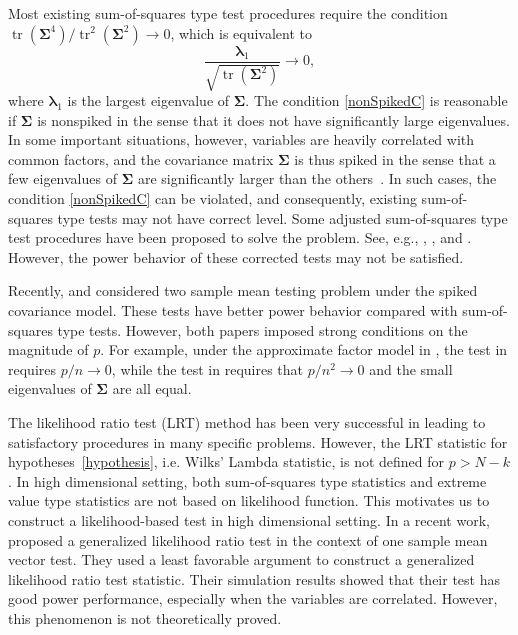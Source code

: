 \documentclass[12pt]{article} %
\DeclareMathOperator{\mytr}{tr}
\newcommand{\bfsym}[1]{\ensuremath{\boldsymbol{#1}}}
\def\blambda {\bfsym {\lambda}}
\def\bSigma {\bfsym {\Sigma}}
\theoremstyle{definition}
\begin{document}
Most existing sum-of-squares type test procedures require the condition 
$\mytr(\bSigma^4)/\mytr^2(\bSigma^2)\to 0$, which is equivalent to
\begin{equation}\label{nonSpikedC}
    \frac{\blambda_1}{\sqrt{\mytr(\bSigma^2)}}\to 0,
\end{equation}
where $\blambda_1$ is the largest eigenvalue of $\bSigma$.
The condition \eqref{nonSpikedC} is reasonable if $\bSigma$ is nonspiked in the sense that it does not have significantly large eigenvalues.
In some important situations, however, variables are heavily correlated with common factors, and the covariance matrix $\bSigma$ is thus spiked in the sense that a few eigenvalues of $\bSigma$ are significantly larger than the others~\citep{Fan2013Large,Cai2015Optimal,wang2017As}.
In such cases, the condition \eqref{nonSpikedC} can be violated, and consequently, existing sum-of-squares type tests may not have correct level.
Some adjusted sum-of-squares type test procedures have been proposed to solve the problem.
See, e.g.,
\cite{Katayama2013Asymptotic}, \cite{Ma2015A}, \cite{ZHANG2017200} and \cite{WANG2018}.
However, the power behavior of these corrected tests may not be satisfied.


Recently, \cite{Aoshima2018} and \cite{WANG2018225} considered two sample mean testing problem under the spiked covariance model.
These tests have better power behavior compared with sum-of-squares type tests.
However, both papers imposed strong conditions on the magnitude of $p$.
For example, under the approximate factor model in \cite{Fan2013Large}, the test in \cite{Aoshima2018} requires $p/n \to 0$, while the test in \cite{WANG2018225} requires that $p/n^2\to 0$ and the small eigenvalues of $\bSigma$ are all equal.

   The likelihood ratio test (LRT) method has been very successful in leading to satisfactory procedures in many specific problems.
    However, the LRT statistic for hypotheses~\eqref{hypothesis}, i.e. Wilks' Lambda statistic, is not defined for $p>N-k$.
   In high dimensional setting, both sum-of-squares type statistics and extreme value type statistics are not based on likelihood function.
    This motivates us to construct a likelihood-based test in high dimensional setting.
    In a recent work,~\cite{Zhao2016A} proposed a generalized likelihood ratio test in the context of one sample mean vector test.
    They used a least favorable argument to construct a generalized likelihood ratio test statistic.
    Their simulation results showed that their test has good power performance, especially when the variables are correlated.
    However, this phenomenon is not theoretically proved.
\end{document}
